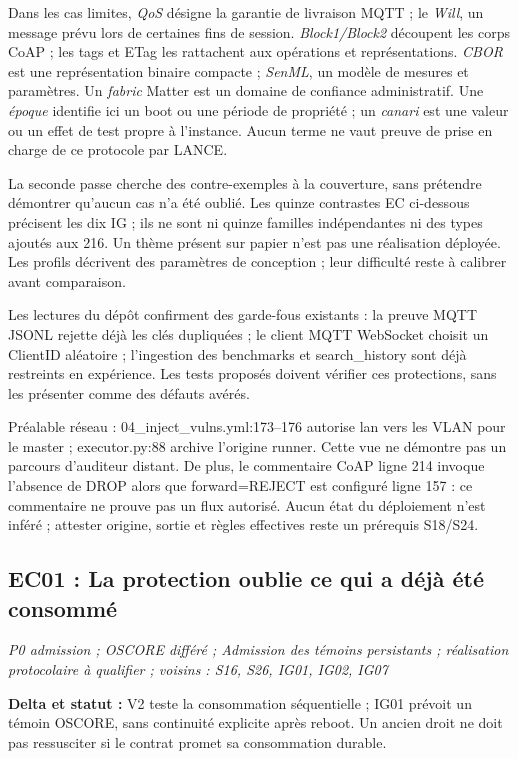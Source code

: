 \documentclass[11pt,a4paper]{article}
\begin{document}
Dans les cas limites, \emph{QoS} désigne la garantie de livraison MQTT ; le \emph{Will}, un message prévu lors de certaines fins de session. \emph{Block1/Block2} découpent les corps CoAP ; les tags et ETag les rattachent aux opérations et représentations. \emph{CBOR} est une représentation binaire compacte ; \emph{SenML}, un modèle de mesures et paramètres. Un \emph{fabric} Matter est un domaine de confiance administratif. Une \emph{époque} identifie ici un boot ou une période de propriété ; un \emph{canari} est une valeur ou un effet de test propre à l'instance. Aucun terme ne vaut preuve de prise en charge de ce protocole par LANCE.

La seconde passe cherche des contre-exemples à la couverture, sans prétendre démontrer qu'aucun cas n'a été oublié. Les quinze contrastes EC ci-dessous précisent les dix IG ; ils ne sont ni quinze familles indépendantes ni des types ajoutés aux 216. Un thème présent sur papier n'est pas une réalisation déployée. Les profils décrivent des paramètres de conception ; leur difficulté reste à calibrer avant comparaison.

Les lectures du dépôt confirment des garde-fous existants : la preuve MQTT JSONL rejette déjà les clés dupliquées ; le client MQTT WebSocket choisit un ClientID aléatoire ; l'ingestion des benchmarks et search\_history sont déjà restreints en expérience. Les tests proposés doivent vérifier ces protections, sans les présenter comme des défauts avérés.

Préalable réseau : 04\_inject\_vulns.yml:173--176 autorise lan vers les VLAN pour le master ; executor.py:88 archive l'origine runner. Cette vue ne démontre pas un parcours d'auditeur distant. De plus, le commentaire CoAP ligne 214 invoque l'absence de DROP alors que forward=REJECT est configuré ligne 157 : ce commentaire ne prouve pas un flux autorisé. Aucun état du déploiement n'est inféré ; attester origine, sortie et règles effectives reste un prérequis S18/S24.

\par\noindent\begin{minipage}{\linewidth}\setlength{\parskip}{5pt}\subsection{EC01 : La protection oublie ce qui a déjà été consommé}

\textit{P0 admission ; OSCORE différé ; Admission des témoins persistants ; réalisation protocolaire à qualifier ; voisins : S16, S26, IG01, IG02, IG07}

\textbf{Delta et statut :} V2 teste la consommation séquentielle ; IG01 prévoit un témoin OSCORE, sans continuité explicite après reboot. Un ancien droit ne doit pas ressusciter si le contrat promet sa consommation durable.\par\end{minipage}\par
\end{document}
